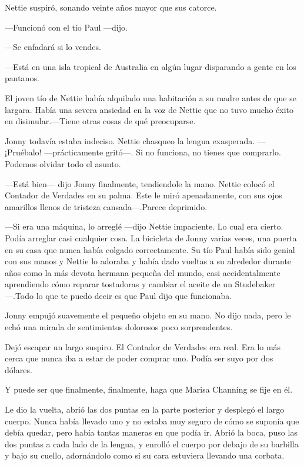 Nettie suspiró, sonando veinte años mayor que sus catorce.

---Funcionó con el tío Paul ---dijo.

---Se enfadará si lo vendes.

---Está en una isla tropical de Australia en algún lugar disparando a
gente en los pantanos.

El joven tío de Nettie había alquilado una habitación a su madre antes
de que se largara. Había una severa ansiedad en la voz de Nettie que no
tuvo mucho éxito en disimular.---Tiene otras cosas de qué preocuparse.

Jonny todavía estaba indeciso. Nettie chasqueo la lengua exasperada.
---¡Pruébalo! ---prácticamente gritó---. Si no funciona, no tienes que
comprarlo. Podemos olvidar todo el asunto.

---Está bien--- dijo Jonny finalmente, tendiendole la mano. Nettie
colocó el Contador de Verdades en su palma. Este le miró apenadamente,
con sus ojos amarillos llenos de tristeza cansada---.Parece deprimido.

---Si era una máquina, lo arreglé ---dijo Nettie impaciente. Lo cual era
cierto. Podía arreglar casi cualquier cosa. La bicicleta de Jonny varias
veces, una puerta en su casa que nunca había colgado correctamente. Su
tío Paul había sido genial con sus manos y Nettie lo adoraba y había
dado vueltas a su alrededor durante años como la más devota hermana
pequeña del mundo, casi accidentalmente aprendiendo cómo reparar
tostadoras y cambiar el aceite de un Studebaker---.Todo lo que te puedo
decir es que Paul dijo que funcionaba.

Jonny empujó suavemente el pequeño objeto en su mano. No dijo nada, pero
le echó una mirada de sentimientos dolorosos poco sorprendentes.

Dejó escapar un largo suspiro. El Contador de Verdades era real. Era lo
más cerca que nunca iba a estar de poder comprar uno. Podía ser suyo por
dos dólares.

Y puede ser que finalmente, finalmente, haga que Marisa Channing se fije
en él.

Le dio la vuelta, abrió las dos puntas en la parte posterior y desplegó
el largo cuerpo. Nunca había llevado uno y no estaba muy seguro de cómo
se suponía que debía quedar, pero había tantas maneras en que podía ir.
Abrió la boca, puso las dos puntas a cada lado de la lengua, y enrolló
el cuerpo por debajo de su barbilla y bajo su cuello, adornándolo como
si su cara estuviera llevando una corbata.

